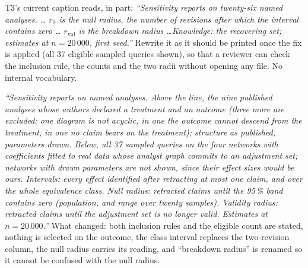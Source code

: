 \begin{exercicio}[metodo=rewriting,conceito=pre-registro]
T3's current caption reads, in part: \emph{``Sensitivity reports on twenty-six named analyses. \dots
$r_0$ is the null radius, the number of revisions after which the interval contains zero \dots
$r_{\mathrm{val}}$ is the breakdown radius \dots Knowledge: the recovering set; estimates at
$n = 20\,000$, first seed.''} Rewrite it as it should be printed once the fix is applied (all 37
eligible sampled queries shown), so that a reviewer can check the inclusion rule, the counts and the
two radii without opening any file. No internal vocabulary.
\end{exercicio}
\begin{solucao}
\emph{``Sensitivity reports on named analyses. Above the line, the nine published analyses whose
authors declared a treatment and an outcome (three more are excluded: one diagram is not acyclic, in one
the outcome cannot descend from the treatment, in one no claim bears on the treatment); structure as
published, parameters drawn. Below, all 37 sampled queries on the four networks with coefficients fitted
to real data whose analyst graph commits to an adjustment set; networks with drawn parameters are not
shown, since their effect sizes would be ours. Intervals: every effect identified after retracting at
most one claim, and over the whole equivalence class. Null radius: retracted claims until the 95\,\%
band contains zero (population, and range over twenty samples). Validity radius: retracted claims until
the adjustment set is no longer valid. Estimates at $n = 20\,000$.''} What changed: both inclusion rules
and the eligible count are stated, nothing is selected on the outcome, the class interval replaces the
two-revision column, the null radius carries its reading, and ``breakdown radius'' is renamed so it
cannot be confused with the null radius.
\end{solucao}

